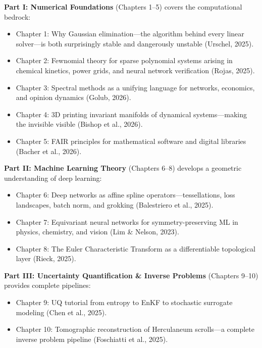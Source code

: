 \medskip
\noindent\textbf{Part I: Numerical Foundations} (Chapters 1--5) covers the computational bedrock:
\begin{itemize}
    \item Chapter 1: Why Gaussian elimination---the algorithm behind every linear solver---is both surprisingly stable and dangerously unstable (Urschel, 2025).
    \item Chapter 2: Fewnomial theory for sparse polynomial systems arising in chemical kinetics, power grids, and neural network verification (Rojas, 2025).
    \item Chapter 3: Spectral methods as a unifying language for networks, economics, and opinion dynamics (Golub, 2026).
    \item Chapter 4: 3D printing invariant manifolds of dynamical systems---making the invisible visible (Bishop et al., 2026).
    \item Chapter 5: FAIR principles for mathematical software and digital libraries (Bacher et al., 2026).
\end{itemize}

\medskip
\noindent\textbf{Part II: Machine Learning Theory} (Chapters 6--8) develops a geometric understanding of deep learning:
\begin{itemize}
    \item Chapter 6: Deep networks as affine spline operators---tessellations, loss landscapes, batch norm, and grokking (Balestriero et al., 2025).
    \item Chapter 7: Equivariant neural networks for symmetry-preserving ML in physics, chemistry, and vision (Lim \& Nelson, 2023).
    \item Chapter 8: The Euler Characteristic Transform as a differentiable topological layer (Rieck, 2025).
\end{itemize}

\medskip
\noindent\textbf{Part III: Uncertainty Quantification \& Inverse Problems} (Chapters 9--10) provides complete pipelines:
\begin{itemize}
    \item Chapter 9: UQ tutorial from entropy to EnKF to stochastic surrogate modeling (Chen et al., 2025).
    \item Chapter 10: Tomographic reconstruction of Herculaneum scrolls---a complete inverse problem pipeline (Foschiatti et al., 2025).
\end{itemize}

